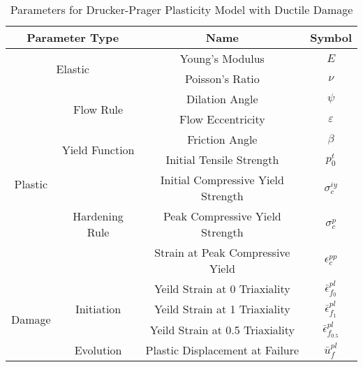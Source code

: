 \begin{table}[]
\centering
\caption{Parameters for Drucker-Prager Plasticity Model with Ductile Damage}
\label{tab:paramdruc}
\begin{tabular}{@{}cccc@{}}
\toprule
\multicolumn{2}{c}{Parameter Type}                         & Name                               & Symbol                                \\ \midrule
\multicolumn{2}{c}{\multirow{2}{*}{Elastic}}               & Young's Modulus                    & $E$                                   \\
\multicolumn{2}{c}{}                                       & Poisson's Ratio                    & $\nu$                                 \\ \cmidrule(r){1-2}
\multirow{7}{*}{Plastic} & \multirow{2}{*}{Flow Rule}      & Dilation Angle                     & $\psi$                                \\
                         &                                 & Flow Eccentricity                  & $\varepsilon$                         \\ \cmidrule(lr){2-2}
                         & \multirow{2}{*}{Yield Function} & Friction Angle                     & $\beta$                               \\
                         &                                 & Initial Tensile Strength           & $p_0^t$                               \\ \cmidrule(lr){2-2}
                         & \multirow{3}{*}{Hardening Rule} & Initial Compressive Yield Strength & $\sigma_c^{iy}$                       \\
                         &                                 & Peak Compressive Yield Strength    & $\sigma_c^{p}$                        \\
                         &                                 & Strain at Peak Compressive Yield   & $\epsilon_c^{pp}$                     \\ \cmidrule(r){1-2}
\multirow{4}{*}{Damage}  & \multirow{3}{*}{Initiation}     & Yeild Strain at 0 Triaxiality      & $\bar{\epsilon}^{pl}_{f_{0}}$   \\
                         &                                 & Yeild Strain at 1 Triaxiality      & $\bar{\epsilon}^{pl}_{f_{1}}$   \\
                         &                                 & Yeild Strain at 0.5 Triaxiality    & $\bar{\epsilon}^{pl}_{f_{0.5}}$ \\ \cmidrule(lr){2-2}
                         & Evolution                       & Plastic Displacement at Failure    & $\bar{u}^{pl}_f$                      \\ \bottomrule
\end{tabular}
\end{table}